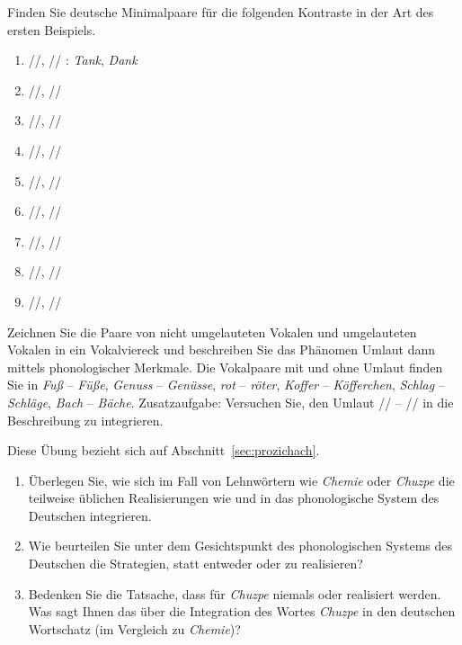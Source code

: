 \Uebungen

\Uebung \label{u41} Finden Sie deutsche Minimalpaare für die folgenden Kontraste in der Art des ersten Beispiels.

\begin{enumerate}\Lf
  \item{//, // : \textit{Tank}, \textit{Dank}}
  \item{//, //}
  \item{//, //}
  \item{//, //}
  \item{//, //}
  \item{//, //}
  \item{//, //}
  \item{//, //}
  \item{//, //}
\end{enumerate}

\Uebung \label{u42} Zeichnen Sie die Paare von nicht umgelauteten Vokalen und umgelauteten Vokalen in ein Vokalviereck und beschreiben Sie das Phänomen Umlaut dann mittels phonologischer Merkmale.
Die Vokalpaare mit und ohne Umlaut finden Sie in \textit{Fuß} -- \textit{Füße}, \textit{Genuss} -- \textit{Genüsse}, \textit{rot} -- \textit{röter}, \textit{Koffer} -- \textit{Köfferchen}, \textit{Schlag} -- \textit{Schläge}, \textit{Bach} -- \textit{Bäche}.
Zusatzaufgabe: Versuchen Sie, den Umlaut // -- // in die Beschreibung zu integrieren.

\Uebung[\tristar] \label{u43} Diese Übung bezieht sich auf Abschnitt~\ref{sec:prozichach}.

\begin{enumerate}\Lf
  \item Überlegen Sie, wie sich im Fall von Lehnwörtern wie \textit{Chemie} oder \textit{Chuzpe} die teilweise üblichen Realisierungen wie \textipa{[\c{c}emi:]} und \textipa{[XU\t{ts}p@]} in das phonologische System des Deutschen integrieren.
  \item Wie beurteilen Sie unter dem Gesichtspunkt des phonologischen Systems des Deutschen die Strategien, statt \textipa{[\c{c}emi:]} entweder \textipa{[Semi:]} oder \textipa{[kemi:]} zu realisieren?
  \item Bedenken Sie die Tatsache, dass für \textit{Chuzpe} niemals \textipa{[SU\t{ts}p@]} oder \textipa{[kU\t{ts}p@]} realisiert werden.
    Was sagt Ihnen das über die Integration des Wortes \textit{Chuzpe} in den deutschen Wortschatz (im Vergleich zu \textit{Chemie})?
\end{enumerate}

